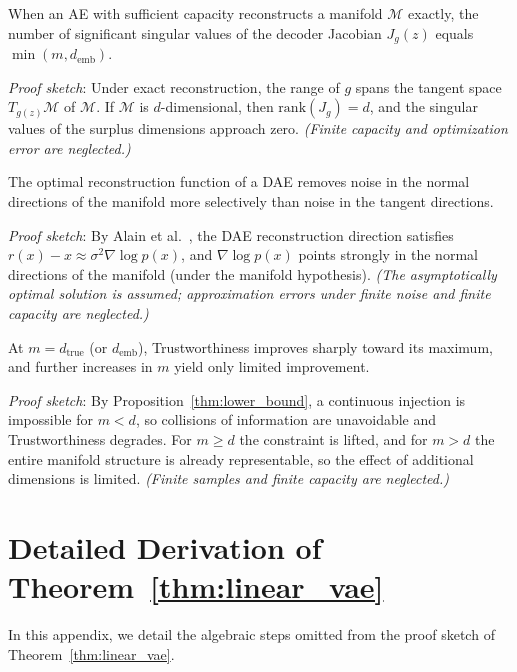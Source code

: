 \documentclass[make,article,submit,pdftex,moreauthors]{Definitions/mdpi}
\newcommand{\dtrue}{d_{\mathrm{true}}}
\newcommand{\Jg}{J_g}
\newcommand{\demb}{d_{\mathrm{emb}}}
\begin{document}
\begin{Proposition}\label{thm:rank}
When an AE with sufficient capacity reconstructs a manifold $\mathcal{M}$ exactly,
the number of significant singular values of the decoder Jacobian $\Jg(z)$ equals
$\min(m, \demb)$.
\end{Proposition}
\textit{Proof sketch}: Under exact reconstruction, the range of $g$ spans the
tangent space $T_{g(z)}\mathcal{M}$ of $\mathcal{M}$.
If $\mathcal{M}$ is $d$-dimensional, then $\mathrm{rank}(\Jg) = d$, and the
singular values of the surplus dimensions approach zero.
\textit{(Finite capacity and optimization error are neglected.)}

\begin{Proposition}\label{thm:nsr}
The optimal reconstruction function of a DAE removes noise in the normal
directions of the manifold more selectively than noise in the tangent directions.
\end{Proposition}
\textit{Proof sketch}: By Alain et al.~\cite{alain2014dae}, the DAE reconstruction
direction satisfies $r(x) - x \approx \sigma^2 \nabla\log p(x)$, and
$\nabla\log p(x)$ points strongly in the normal directions of the manifold
(under the manifold hypothesis).
\textit{(The asymptotically optimal solution is assumed; approximation errors
under finite noise and finite capacity are neglected.)}

\begin{Proposition}\label{thm:trust}
At $m = \dtrue$ (or $\demb$), Trustworthiness improves sharply toward its maximum,
and further increases in $m$ yield only limited improvement.
\end{Proposition}
\textit{Proof sketch}: By Proposition~\ref{thm:lower_bound}, a continuous injection
is impossible for $m < d$, so collisions of information are unavoidable and
Trustworthiness degrades.
For $m \geq d$ the constraint is lifted, and for $m > d$ the entire manifold
structure is already representable, so the effect of additional dimensions is
limited.
\textit{(Finite samples and finite capacity are neglected.)}

\section[\appendixname~\thesection]{Detailed Derivation of Theorem~\ref{thm:linear_vae}}\label{app:linear_vae_proof}

In this appendix, we detail the algebraic steps omitted from the proof sketch of
Theorem~\ref{thm:linear_vae}.
\end{document}
